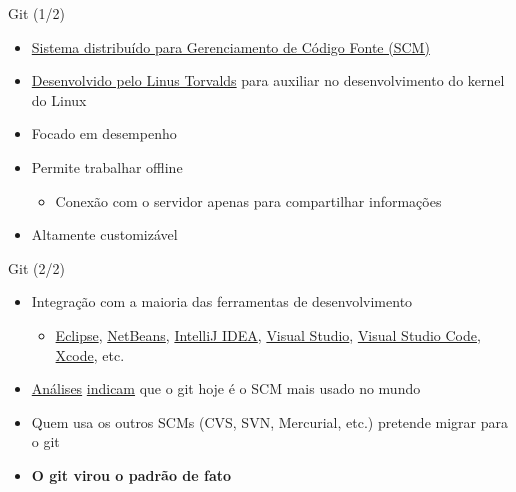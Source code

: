 \documentclass[14pt]{beamer}
\begin{document}
\begin{frame}{Git (1/2)}
    \begin{itemize}
        \item \href{https://git-scm.com}{Sistema distribuído para Gerenciamento
        de Código Fonte (SCM)}
        \item
        \href{https://www.atlassian.com/git/articles/10-years-of-git}{Desenvolvido
        pelo Linus Torvalds} para auxiliar no desenvolvimento do kernel do Linux
        \item Focado em desempenho
        \item Permite trabalhar offline
        \begin{itemize}
            \item Conexão com o servidor apenas para compartilhar informações
        \end{itemize}
        \item Altamente customizável
    \end{itemize}    
\end{frame}

\begin{frame}{Git (2/2)}
    \begin{itemize}
        \item Integração com a maioria das ferramentas de desenvolvimento
        \begin{itemize}
            \item \href{http://www.eclipse.org}{Eclipse},
            \href{https://netbeans.org/}{NetBeans},
            \href{https://www.jetbrains.com/idea}{IntelliJ IDEA},
            \href{https://www.visualstudio.com}{Visual Studio},
            \href{https://code.visualstudio.com/}{Visual Studio Code},
            \href{https://developer.apple.com/xcode}{Xcode},
            etc.
        \end{itemize}
        \item
        \href{https://rhodecode.com/insights/version-control-systems-2016}{Análises}
        \href{https://softwareengineering.stackexchange.com/questions/136079/are-there-any-statistics-that-show-the-popularity-of-git-versus-svn}{indicam}
        que o git hoje é o SCM mais usado no mundo
        \item Quem usa os outros SCMs (CVS, SVN, Mercurial, etc.) pretende
        migrar para o git
        \item \textbf{O git virou o padrão de fato}
    \end{itemize}    
\end{frame}
\end{document}
